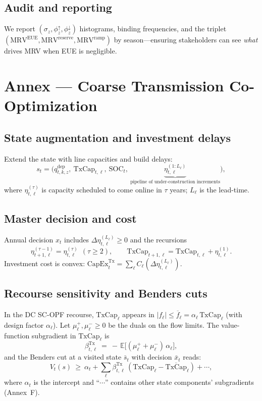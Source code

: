 \documentclass[11pt]{article}
\newcommand{\E}{\mathbb{E}}
\numberwithin{equation}{section}
\theoremstyle{definition}
\theoremstyle{remark}
\begin{document}
\subsection{ Audit and reporting}
We report $(\sigma_z,\phi^{\uparrow}_z,\phi^{\downarrow}_z)$ histograms, binding frequencies, and the triplet $(\mathrm{MRV}^{\text{EUE}},\mathrm{MRV}^{\text{reserve}},\mathrm{MRV}^{\text{ramp}})$ by season—ensuring stakeholders can see \emph{what} drives MRV when EUE is negligible.

\section{Annex  — Coarse Transmission Co-Optimization}
\label{annex:Coarse_Transmission}

\subsection{ State augmentation and investment delays}
Extend the state with line capacities and build delays:
\[
s_t=\big(q^{\mathrm{dep}}_{t,k,z},\ \mathrm{TxCap}_{t,\ell},\ \mathrm{SOC}_{t},\ \underbrace{\eta_{t,\ell}^{(1:L_\ell)}}_{\text{pipeline of under-construction increments}}\big),
\]
where $\eta^{(\tau)}_{t,\ell}$ is capacity scheduled to come online in $\tau$ years; $L_\ell$ is the lead-time.

\subsection{ Master decision and cost}
Annual decision $x_t$ includes $\Delta \eta_{t,\ell}^{(L_\ell)}\ge 0$ and the recursions
\[
\eta_{t+1,\ell}^{(\tau-1)}=\eta_{t,\ell}^{(\tau)}\ \ (\tau\ge 2),\qquad
\mathrm{TxCap}_{t+1,\ell}=\mathrm{TxCap}_{t,\ell}+\eta_{t,\ell}^{(1)}.
\]
Investment cost is convex: $\mathrm{CapEx}^{\mathrm{Tx}}_{t}=\sum_{\ell} C_\ell(\Delta \eta_{t,\ell}^{(L_\ell)})$.

\subsection{ Recourse sensitivity and Benders cuts}
In the DC SC-OPF recourse, $\mathrm{TxCap}_\ell$ appears in $|f_\ell|\le \overline f_\ell=\alpha_\ell \,\mathrm{TxCap}_\ell$ (with design factor $\alpha_\ell$). Let $\mu_\ell^{+},\mu_\ell^{-}\ge 0$ be the duals on the flow limits. The value-function subgradient in $\mathrm{TxCap}_\ell$ is
\[
\beta_{t,\ell}^{\mathrm{Tx}} \ =\ -\,\E\!\big[(\mu_\ell^{+}+\mu_\ell^{-})\,\alpha_\ell\big],
\]
and the Benders cut at a visited state $\bar s_t$ with decision $\bar x_t$ reads:
\[
V_t(s) \ \ge\ \alpha_t + \sum_{\ell}\beta_{t,\ell}^{\mathrm{Tx}}\,(\mathrm{TxCap}_{\ell}-\overline{\mathrm{TxCap}}_{\ell}) + \cdots,
\]
where $\alpha_t$ is the intercept and “$\cdots$” contains other state components’ subgradients (Annex~F).
\end{document}
